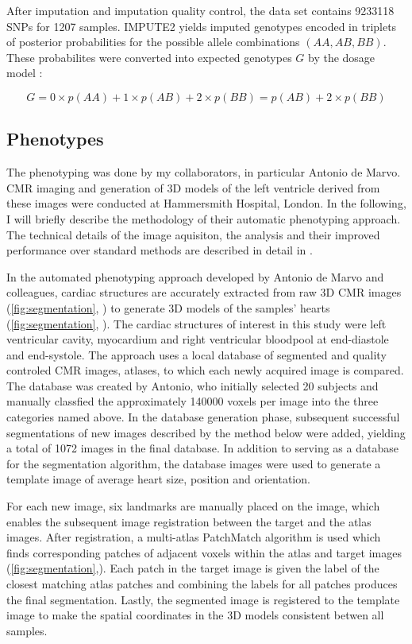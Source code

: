 After imputation and imputation quality control, the data set contains \num{9233118} SNPs for \num{1207} samples. IMPUTE2 yields imputed genotypes encoded in triplets of posterior probabilities for the possible allele combinations \((AA, AB, BB)\). These probabilites were converted into expected genotypes \(G\) by the dosage model \citep{Howie2011}:

\begin{equation}
	G = 0 \times p(AA) + 1 \times p(AB) + 2 \times p(BB) = p(AB) + 2 \times p(BB)
\end{equation}


\subsection{Phenotypes}
\label{subsection:phentoypes}
The phenotyping was done by my collaborators, in particular Antonio de Marvo. CMR imaging and generation of 3D models of the left ventricle derived from these images were conducted at Hammersmith Hospital, London. In the following, I will briefly describe the methodology of their automatic phenotyping approach. The technical details of the image aquisiton, the analysis and their improved performance over standard methods are described in detail in \citep{DeMarvao2014}. 

In the automated phenotyping approach developed by Antonio de Marvo and colleagues, cardiac structures are accurately extracted from raw 3D CMR images (\cref{fig:segmentation}, ) to generate 3D models of the samples' hearts  (\cref{fig:segmentation}, ). The cardiac structures of interest in this study were left ventricular cavity, myocardium and right ventricular bloodpool at end-diastole and end-systole. The approach uses a local database of segmented and quality controled CMR images, atlases,  to which each newly acquired image is compared. The database was created by Antonio, who initially selected \num{20} subjects and manually classfied the approximately \num{140000} voxels per image into the three categories named above. In the database generation phase, subsequent successful segmentations of new images described by the method below were added, yielding a total of \num{1072} images in the final database. In addition to serving as a database for the segmentation algorithm, the database images were used to generate a template image of average heart size, position and orientation. 

For each new image, six landmarks are manually placed on the image, which enables the subsequent image registration between the target and the atlas images. After registration, a multi-atlas PatchMatch algorithm is used which finds corresponding patches of adjacent voxels within the atlas and target images (\cref{fig:segmentation},). Each patch in the target image is given the label of the closest matching atlas patches and combining the labels for all patches produces the final segmentation. Lastly, the segmented image is registered to the template image to make the spatial coordinates in the 3D models consistent betwen all samples.  

